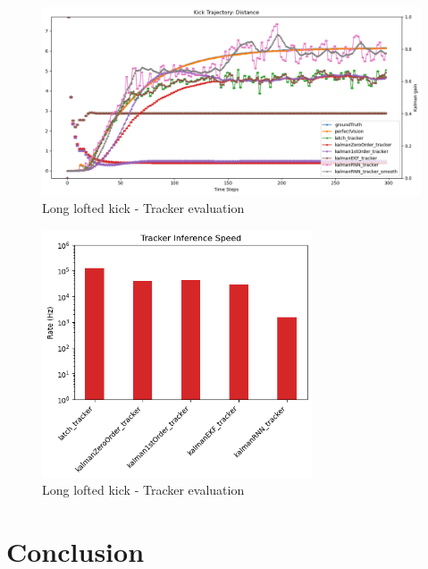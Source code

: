 \documentclass[a4paper,twoside,12pt]{report}
\begin{document}
\begin{figure}[h!]
\begin{center}
\includegraphics[width=12cm]{images/eval_loft_long.png}
\caption{Long lofted kick - Tracker evaluation}
\label{fig:ekfloftlong}
\end{center}
\end{figure}

\begin{figure}[h!]
\begin{center}
\includegraphics[width=8cm]{images/tracker_speeds.png}
\caption{Long lofted kick - Tracker evaluation}
\label{fig:ekfloftlong}
\end{center}
\end{figure}

\chapter{Conclusion}
\end{document}
